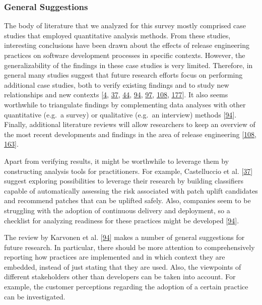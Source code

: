 \documentclass[]{book}
\begin{document}
\subsubsection{General Suggestions}\label{general-suggestions}

The body of literature that we analyzed for this survey mostly comprised
case studies that employed quantitative analysis methods. From these
studies, interesting conclusions have been drawn about the effects of
release engineering practices on software development processes in
specific contexts. However, the generalizability of the findings in
these case studies is very limited. Therefore, in general many studies
suggest that future research efforts focus on performing additional case
studies, both to verify existing findings and to study new relationships
and new contexts {[}\protect\hyperlink{ref-adams2016a}{4},
\protect\hyperlink{ref-castelluccio2017a}{37},
\protect\hyperlink{ref-claes2017a}{44},
\protect\hyperlink{ref-karvonen2017a}{94},
\protect\hyperlink{ref-khomh2015a}{97},
\protect\hyperlink{ref-laukkanen2018a}{108},
\protect\hyperlink{ref-teixeira2017a}{177}{]}. It also seems worthwhile
to triangulate findings by complementing data analyses with other
quantitative (e.g.~a survey) or qualitative (e.g.~an interview) methods
{[}\protect\hyperlink{ref-karvonen2017a}{94}{]}. Finally, additional
literature reviews will allow researchers to keep an overview of the
most recent developments and findings in the area of release engineering
{[}\protect\hyperlink{ref-laukkanen2018a}{108},
\protect\hyperlink{ref-rodriguez2017a}{163}{]}.

Apart from verifying results, it might be worthwhile to leverage them by
constructing analysis tools for practitioners. For example, Castelluccio
et al. {[}\protect\hyperlink{ref-castelluccio2017a}{37}{]} suggest
exploring possibilities to leverage their research by building
classifiers capable of automatically assessing the risk associated with
patch uplift candidates and recommend patches that can be uplifted
safely. Also, companies seem to be struggling with the adoption of
continuous delivery and deployment, so a checklist for analyzing
readiness for these practices might be developed
{[}\protect\hyperlink{ref-karvonen2017a}{94}{]}.

The review by Karvonen et al.
{[}\protect\hyperlink{ref-karvonen2017a}{94}{]} makes a number of
general suggestions for future research. In particular, there should be
more attention to comprehensively reporting how practices are
implemented and in which context they are embedded, instead of just
stating that they are used. Also, the viewpoints of different
stakeholders other than developers can be taken into account. For
example, the customer perceptions regarding the adoption of a certain
practice can be investigated.
\end{document}
